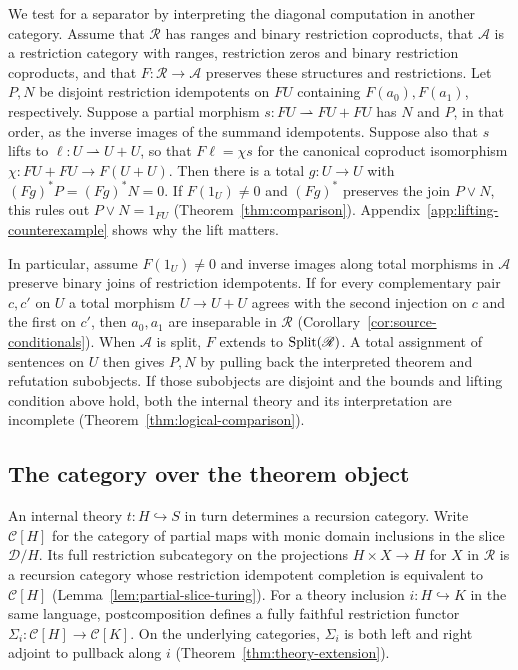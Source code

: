 We test for a separator by interpreting the diagonal computation in
another category. Assume that $\mathscr R$ has ranges and binary restriction
coproducts, that $\mathcal A$ is a restriction category with ranges,
restriction zeros and binary restriction coproducts, and that
$F:\mathscr R\to\mathcal A$ preserves these structures and restrictions.
Let $P,N$ be disjoint restriction idempotents on $FU$ containing
$F(a_0),F(a_1)$, respectively. Suppose a partial morphism
$s:FU\rightharpoonup FU+FU$ has $N$ and $P$, in that order, as the inverse
images of the summand idempotents. Suppose also that $s$ lifts to
$\ell:U\rightharpoonup U+U$, so that $F\ell=\chi s$ for the canonical
coproduct isomorphism $\chi:FU+FU\to F(U+U)$. Then there is a total
$g:U\to U$ with $(Fg)^*P=(Fg)^*N=0$. If $F(1_U)\ne0$ and $(Fg)^*$
preserves the join $P\vee N$, this rules out $P\vee N=1_{FU}$
(Theorem~\ref{thm:comparison}). Appendix~\ref{app:lifting-counterexample}
shows why the lift matters.

In particular, assume $F(1_U)\ne0$ and inverse images along total
morphisms in $\mathcal A$ preserve binary joins of restriction idempotents.
If for every complementary pair $c,c'$ on $U$ a total morphism
$U\to U+U$ agrees with the second injection on $c$ and the first on $c'$,
then $a_0,a_1$ are inseparable in $\mathscr R$
(Corollary~\ref{cor:source-conditionals}). When $\mathcal A$ is split,
$F$ extends to $\operatorname{Split}(\mathscr R)$. A total assignment of sentences on $U$
then gives $P,N$ by pulling back the interpreted theorem and refutation
subobjects. If those subobjects are disjoint and the bounds and lifting
condition above hold, both the internal theory and its interpretation are
incomplete (Theorem~\ref{thm:logical-comparison}).

\subsection{The category over the theorem object}

An internal theory $t:H\hookrightarrow S$ in turn determines a recursion
category. Write $\mathscr C[H]$ for the category of partial maps with
monic domain inclusions in the slice $\mathcal D/H$. Its full restriction
subcategory on the projections $H\times X\to H$ for $X$ in $\mathscr R$
is a recursion category whose restriction idempotent completion is
equivalent to $\mathscr C[H]$ (Lemma~\ref{lem:partial-slice-turing}).
For a theory inclusion $i:H\hookrightarrow K$ in the same language,
postcomposition defines a fully faithful restriction functor
$\Sigma_i:\mathscr C[H]\to\mathscr C[K]$. On the underlying categories,
$\Sigma_i$ is both left and right adjoint to pullback along $i$
(Theorem~\ref{thm:theory-extension}).


